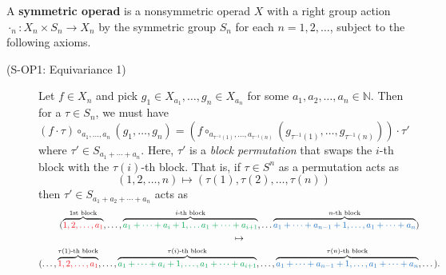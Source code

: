 \begin{definition}
    A \textbf{symmetric operad} is a nonsymmetric operad $X$ with a 
    right group action $\cdot_n: X_n \times S_n \to X_n$
    by the symmetric group $S_n$
    for each $n = 1, 2, \dots$, subject to the following axioms. 
    \begin{description}
        \item[(S-OP1: Equivariance 1)]
        Let $f \in X_n$ and pick $g_{1} \in X_{a_1}, \dots, g_n \in X_{a_n}$ for 
        some $a_1, a_2, \dots, a_n \in \mathbb{N}$. Then for a $\tau \in S_n$, we must 
        have 
        \[
            (f \cdot \tau)\circ_{a_1, \dots, a_n}(g_1, \dots, g_n)
            =
            (f \circ_{a_{\tau^{-1}(1)}, \dots, a_{\tau^{-1}(n)}}(g_{\tau^{-1}(1)}, \dots, g_{\tau^{-1}(n)}))\cdot \tau'
        \]
        where $\tau' \in S_{a_1 + \cdots + a_n}$. Here, $\tau'$ is a \emph{block permutation} 
        that swaps the $i$-th block with the $\tau(i)$-th block. That is, if 
        $\tau \in S^n$ as a permutation acts as 
        \[
            (1, 2, \dots, n) \mapsto (\tau(1), \tau(2), \dots, \tau(n))
        \]
        then $\tau' \in S_{a_1 + a_2 + \cdots + a_n}$ acts as 
        \begin{gather*}
            (\overbrace{\textcolor{Red}{1, 2, \dots, a_1}}^{\text{1st block}}, \dots, 
            \overbrace{\textcolor{Green}{a_1 + \cdots + a_i+1, \dots a_1 + \cdots + a_{i+1}}}^{i\text{-th block}}, \dots
            \overbrace{\textcolor{RoyalBlue}{a_1 + \cdots + a_{n-1}+ 1, \dots, a_1 + \cdots + a_n}}^{n\text{-th block}})\\
            \mapsto\\
            (\dots, \overbrace{\textcolor{Red}{1, 2, \dots, a_1}}^{\tau(1)\text{-th block}}, \dots 
            ,  \overbrace{\textcolor{Green}{a_1 + \cdots + a_i+1, \dots, a_1 + \cdots + a_{i+1}}}^{\tau(i)\text{-th block}}, \dots
            ,  \overbrace{\textcolor{RoyalBlue}{a_1 + \cdots +  a_{n-1}+1, \dots, a_1 + \cdots + a_{n}}}^{\tau(n)\text{-th block}}, \dots
            ).
        \end{gather*}


\end{description}
\end{definition}
